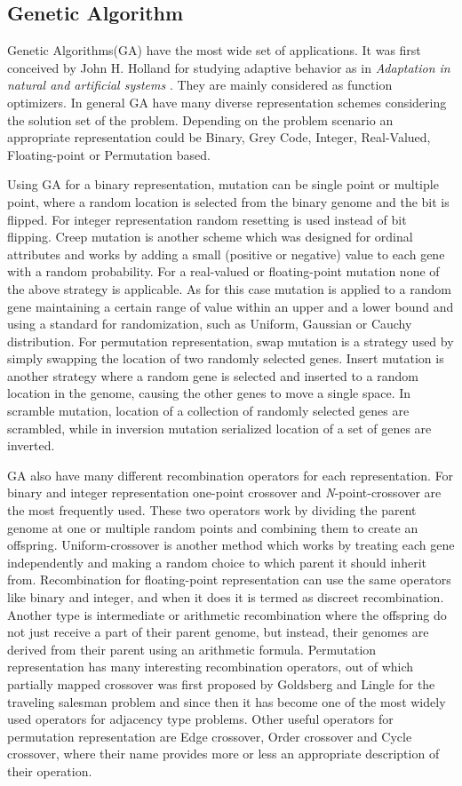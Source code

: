 \subsection{Genetic Algorithm}
Genetic Algorithms(GA) have the most wide set of applications. It was first conceived by John H. Holland for studying adaptive behavior as in \textit{Adaptation in natural and artificial systems} \cite{holland1975}. They are mainly considered as function optimizers. In general GA have many diverse representation schemes considering the solution set of the problem. Depending on the problem scenario an appropriate representation could be Binary, Grey Code, Integer, Real-Valued, Floating-point or Permutation based. 

Using GA for a binary representation, mutation can be single point or multiple point, where a random location is selected from the binary genome and the bit is flipped. For integer representation random resetting is used instead of bit flipping. Creep mutation is another scheme which was designed for ordinal attributes and works by adding a small (positive or negative) value to each gene with a random probability. For a real-valued or floating-point mutation none of the above strategy is applicable. As for this case mutation is applied to a random gene maintaining a certain range of value within an upper and a lower bound and using a standard for randomization, such as Uniform, Gaussian or Cauchy distribution. For permutation representation, swap mutation is a strategy used by simply swapping the location of two randomly selected genes. Insert mutation is another strategy where a random gene is selected and inserted to a random location in the genome, causing the other genes to move a single space. In scramble mutation, location of a collection of randomly selected genes are scrambled, while in inversion mutation serialized location of a set of genes are inverted. 

GA also have many different recombination operators for each representation. For binary and integer representation one-point crossover and \textit{N}-point-crossover are the most frequently used. These two operators work by dividing the parent genome at one or multiple random points and combining them to create an offspring. Uniform-crossover \cite{sywerda1989} is another method which works by treating each gene independently and making a random choice to which parent it should inherit from. Recombination for floating-point representation can use the same operators like binary and integer, and when it does it is termed as discreet recombination. Another type is intermediate or arithmetic recombination where the offspring do not just receive a part of their parent genome, but instead, their genomes are derived from their parent using an arithmetic formula. Permutation representation has many interesting recombination operators, out of which partially mapped crossover was first proposed by Goldsberg and Lingle \cite{goldberg1985} for the traveling salesman problem and since then it has become one of the most widely used operators for adjacency type problems. Other useful operators for permutation representation are Edge crossover, Order crossover and Cycle crossover, where their name provides more or less an appropriate description of their operation.

